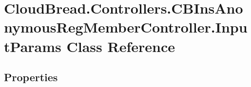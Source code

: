 \hypertarget{class_cloud_bread_1_1_controllers_1_1_c_b_ins_anonymous_reg_member_controller_1_1_input_params}{}\section{Cloud\+Bread.\+Controllers.\+C\+B\+Ins\+Anonymous\+Reg\+Member\+Controller.\+Input\+Params Class Reference}
\label{class_cloud_bread_1_1_controllers_1_1_c_b_ins_anonymous_reg_member_controller_1_1_input_params}
\subsection*{Properties}
